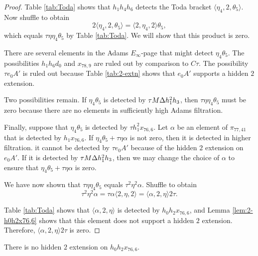 \begin{proof}
Table \ref{tab:Toda} shows that $h_1 h_4 h_6$ detects the Toda bracket
$\langle \eta_4, 2, \theta_5 \rangle$.
Now shuffle to obtain
\[
2 \langle \eta_4, 2, \theta_5 \rangle =
\langle 2, \eta_4, 2 \rangle \theta_5,
\]
which equals $\tau \eta \eta_4 \theta_5$ by Table \ref{tab:Toda}.
We will show that this product is zero.

There are several elements in the Adams $E_\infty$-page
that might detect $\eta_4 \theta_5$.  The possibilities
$h_1 h_6 d_0$ and $x_{78,9}$ are ruled out by comparison to $C\tau$.
The possibility $\tau e_0 A'$ is ruled out because
Table \ref{tab:2-extn} shows that $e_0 A'$ supports a hidden
$2$ extension.

Two possibilities remain.  If $\eta_4 \theta_5$ is detected
by $\tau M \Delta h_1^2 h_3$, then $\tau \eta \eta_4 \theta_5$
must be zero because there are no elements in sufficiently
high Adams filtration.

Finally, suppose that $\eta_4 \theta_5$ is detected by
$\tau h_1^2 x_{76,6}$.  Let $\alpha$ be an element of $\pi_{77,41}$
that is detected by $h_1 x_{76,6}$.
If $\eta_4 \theta_5 + \tau \eta \alpha$ is not zero,
then it is detected in
higher filtration.  
it cannot be detected by $\tau e_0 A'$
because of the hidden $2$ extension on $e_0 A'$.
If it is detected by $\tau M \Delta h_1^2 h_3$, then we may
change the choice of $\alpha$ to ensure that
$\eta_4 \theta_5 + \tau \eta \alpha$ is zero.

We have now shown that $\tau \eta \eta_4 \theta_5$
equals $\tau^2 \eta^2 \alpha$.
Shuffle to obtain
\[
\tau^2 \eta^2 \alpha =
\tau \alpha \langle 2, \eta, 2 \rangle =
\langle \alpha, 2, \eta \rangle 2 \tau.
\]

Table \ref{tab:Toda} shows that
$\langle \alpha, 2, \eta \rangle$ is detected
by $h_0 h_2 x_{76,6}$, and Lemma \ref{lem:2-h0h2x76,6}
shows that this element does not support a hidden $2$ extension.
Therefore,
$\langle \alpha, 2, \eta \rangle 2 \tau$ is zero.
\end{proof}

\begin{lemma}
\label{lem:2-h0h2x76,6}
There is no hidden $2$ extension on $h_0 h_2 x_{76,6}$.
\end{lemma}

